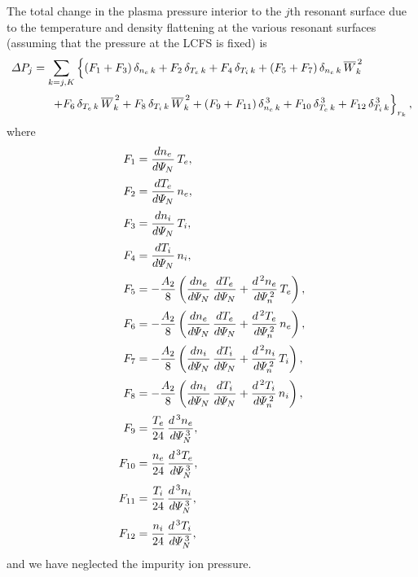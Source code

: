 \documentclass[notitlepage,12pt]{article}
\begin{document}
The total change in the plasma pressure interior to the $j$th resonant surface due to the temperature and
density flattening at the various resonant surfaces (assuming that the pressure at the LCFS is fixed) is
\begin{align}
{\mit\Delta}P_j &=\sum_{k=j,K} 
\left\{(F_1+F_3)\,\delta_{n_e\,k}+ F_2\,\delta_{T_e\,k}+F_4\,\delta_{T_i\,k} + (F_5+F_7)\,\delta_{n_e\,k}\,\overline{W}_k^{\,2}
\right.\nonumber\\[0.5ex]
&\phantom{++}\left.+F_6\, \delta_{T_e\,k}\,\overline{W}_k^{\,2}+ F_8\,\delta_{T_i\,k}\,\overline{W}_k^{\,2}+ (F_9+F_{11})\,\delta_{n_e\,k}^{\,3}
+ F_{10}\,\delta_{T_e\,k}^{\,3}+ F_{12}\,\delta_{T_i\,k}^{\,3}\right\}_{r_k},
\end{align}
where
\begin{align}
F_1 &=\frac{dn_e}{d{\mit\Psi}_N}\,T_e,\\[0.5ex]
F_2 &=\frac{dT_e}{d{\mit\Psi}_N}\,n_e,\\[0.5ex]
F_3 &=\frac{dn_i}{d{\mit\Psi}_N}\,T_i,\\[0.5ex]
F_4 &=\frac{dT_i}{d{\mit\Psi}_N}\,n_i,\\[0.5ex]
F_5&= -\frac{A_2}{8}\left(\frac{dn_e}{d{\mit\Psi}_N}\,\frac{dT_e}{d{\mit\Psi}_N}+\frac{d^{\,2}n_e}{d{\mit\Psi}_n^{\,2}}\,T_e\right),\\[0.5ex]
F_6&= -\frac{A_2}{8}\left(\frac{dn_e}{d{\mit\Psi}_N}\,\frac{dT_e}{d{\mit\Psi}_N}+\frac{d^{\,2}T_e}{d{\mit\Psi}_n^{\,2}}\,n_e\right),\\[0.5ex]
F_7& =-\frac{A_2}{8}\left(\frac{dn_i}{d{\mit\Psi}_N}\,\frac{dT_i}{d{\mit\Psi}_N}+\frac{d^{\,2}n_i}{d{\mit\Psi}_n^{\,2}}\,T_i\right),\\[0.5ex]
F_8& =-\frac{A_2}{8}\left(\frac{dn_i}{d{\mit\Psi}_N}\,\frac{dT_i}{d{\mit\Psi}_N}+\frac{d^{\,2}T_i}{d{\mit\Psi}_n^{\,2}}\,n_i\right),\\[0.5ex]
F_9&=\frac{T_e}{24}\,\frac{d^{\,3}n_e}{d{\mit\Psi}_N^{\,3}},\\[0.5ex]
F_{10}&=\frac{n_e}{24}\,\frac{d^{\,3}T_e}{d{\mit\Psi}_N^{\,3}},\\[0.5ex]
F_{11}&=\frac{T_i}{24}\,\frac{d^{\,3}n_i}{d{\mit\Psi}_N^{\,3}},\\[0.5ex]
F_{12}&=\frac{n_i}{24}\,\frac{d^{\,3}T_i}{d{\mit\Psi}_N^{\,3}},
\end{align} 
and we have neglected the impurity ion pressure. 
\end{document}
